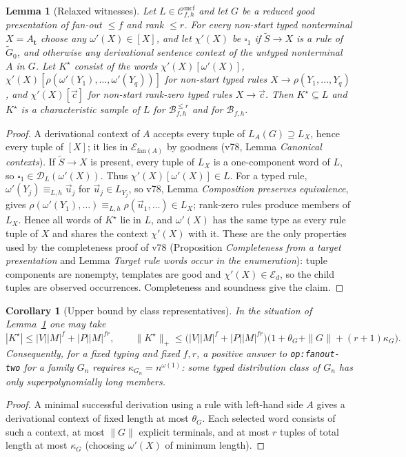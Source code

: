 \documentclass[11pt]{article}
\newtheorem{lemma}[theorem]{Lemma}
\newtheorem{corollary}[theorem]{Corollary}
\theoremstyle{definition}
\theoremstyle{remark}
\newcommand{\Cmcf}[2]{\mathcal{C}^{\mathrm{mcf}}_{#1,#2}}
\newcommand{\D}{\mathcal{D}}
\newcommand{\tuple}[1]{\vec{#1}}
\newcommand{\blank}{\square}
\newcommand{\B}{\mathcal B}
\begin{document}
\begin{lemma}[Relaxed witnesses]\label{lem:relaxed}
Let $L\in\Cmcf{f}{h}$ and let $G$ be a reduced good presentation of
fan-out $\le f$ and rank $\le r$.  For every non-start typed nonterminal
$X=A_{\mathbf t}$ choose any $\omega'(X)\in[X]$, and let $\chi'(X)$ be
$\blank_1$ if $\widetilde S\to X$ is a rule of $\widetilde G_0$, and
otherwise any derivational sentence context of the untyped nonterminal $A$
in $G$.  Let $K^\star$ consist of the words
$\chi'(X)[\omega'(X)]$, $\chi'(X)[\rho(\omega'(Y_1),\ldots,\omega'(Y_q))]$
for non-start typed rules $X\to\rho(Y_1,\ldots,Y_q)$, and
$\chi'(X)[\tuple c]$ for non-start rank-zero typed rules $X\to\tuple c$.
Then $K^\star\subseteq L$ and $K^\star$ is a characteristic sample of $L$
for $\B^{\le r}_{f,h}$ and for $\B_{f,h}$.
\end{lemma}
\begin{proof}
A derivational context of $A$ accepts every tuple of $L_A(G)\supseteq L_X$,
hence every tuple of $[X]$; it lies in $\mathcal E_{\mathrm{fan}(A)}$ by
goodness (v78, Lemma \emph{Canonical contexts}).  If $\widetilde S\to X$ is
present, every tuple of $L_X$ is a one-component word of $L$, so
$\blank_1\in\D_L(\omega'(X))$.  Thus $\chi'(X)[\omega'(X)]\in L$.  For a
typed rule, $\omega'(Y_j)\equiv_{L,h}\tuple u_j$ for $\tuple u_j\in L_{Y_j}$,
so v78, Lemma \emph{Composition preserves equivalence}, gives
$\rho(\omega'(Y_1),\ldots)\equiv_{L,h}\rho(\tuple u_1,\ldots)\in L_X$;
rank-zero rules produce members of $L_X$.  Hence all words of $K^\star$
lie in $L$, and $\omega'(X)$ has the same type as every rule tuple of $X$
and shares the context $\chi'(X)$ with it.  These are the only properties
used by the completeness proof of v78 (Proposition \emph{Completeness from a
target presentation} and Lemma \emph{Target rule words occur in the
enumeration}): tuple components are nonempty, templates are good and
$\chi'(X)\in\mathcal E_d$, so the child tuples are observed occurrences.
Completeness and soundness give the claim.
\end{proof}

\begin{corollary}[Upper bound by class representatives]
\label{cor:relaxed-bound}
In the situation of Lemma~\ref{lem:relaxed} one may take
\[
 |K^\star|\le|V||M|^f+|P||M|^{fr},\qquad
 \|K^\star\|_+\le\bigl(|V||M|^f+|P||M|^{fr}\bigr)
 \bigl(1+\theta_G+\|G\|+(r+1)\kappa_G\bigr).
\]
Consequently, for a fixed typing and fixed $f,r$, a positive answer to
\texttt{op:fanout-two} for a family $G_n$ \emph{requires}
$\kappa_{G_n}=n^{\omega(1)}$: some typed distribution class of $G_n$ has
only superpolynomially long members.
\end{corollary}
\begin{proof}
A minimal successful derivation using a rule with left-hand side $A$ gives
a derivational context of fixed length at most $\theta_G$.  Each selected
word consists of such a context, at most $\|G\|$ explicit terminals, and at
most $r$ tuples of total length at most $\kappa_G$ (choosing $\omega'(X)$
of minimum length).
\end{proof}
\end{document}
